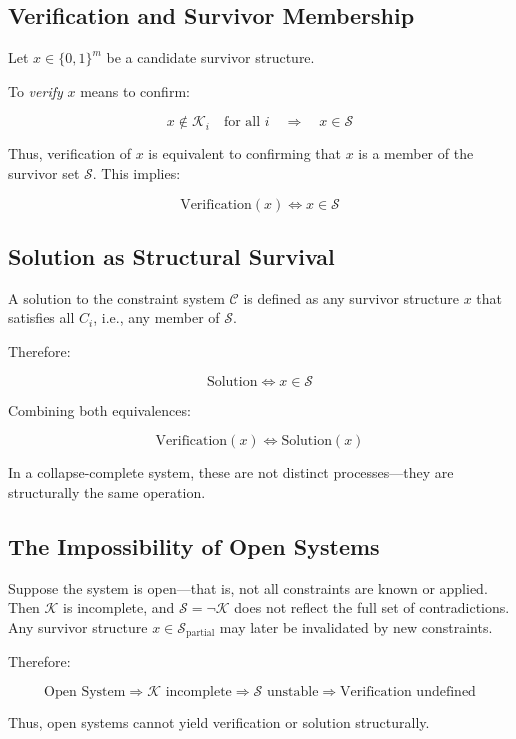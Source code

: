 \documentclass[12pt]{article}
\begin{document}
\subsection{Verification and Survivor Membership}

Let $x \in \{0,1\}^m$ be a candidate survivor structure.

To \textit{verify} $x$ means to confirm:

\[
x \notin \mathcal{K}_i \quad \text{for all } i
\quad \Rightarrow \quad
x \in \mathcal{S}
\]

Thus, verification of $x$ is equivalent to confirming that $x$ is a member of the survivor set $\mathcal{S}$. This implies:

\[
\text{Verification}(x) \Leftrightarrow x \in \mathcal{S}
\]

\subsection{Solution as Structural Survival}

A solution to the constraint system $\mathcal{C}$ is defined as any survivor structure $x$ that satisfies all $C_i$, i.e., any member of $\mathcal{S}$.

Therefore:

\[
\text{Solution} \Leftrightarrow x \in \mathcal{S}
\]

Combining both equivalences:

\[
\text{Verification}(x) \Leftrightarrow \text{Solution}(x)
\]

In a collapse-complete system, these are not distinct processes—they are structurally the same operation.

\subsection{The Impossibility of Open Systems}

Suppose the system is open—that is, not all constraints are known or applied. Then $\mathcal{K}$ is incomplete, and $\mathcal{S} = \neg \mathcal{K}$ does not reflect the full set of contradictions. Any survivor structure $x \in \mathcal{S}_{\text{partial}}$ may later be invalidated by new constraints.

Therefore:

\[
\text{Open System} \Rightarrow \mathcal{K} \text{ incomplete} \Rightarrow \mathcal{S} \text{ unstable} \Rightarrow \text{Verification undefined}
\]

Thus, open systems cannot yield verification or solution structurally.
\end{document}
